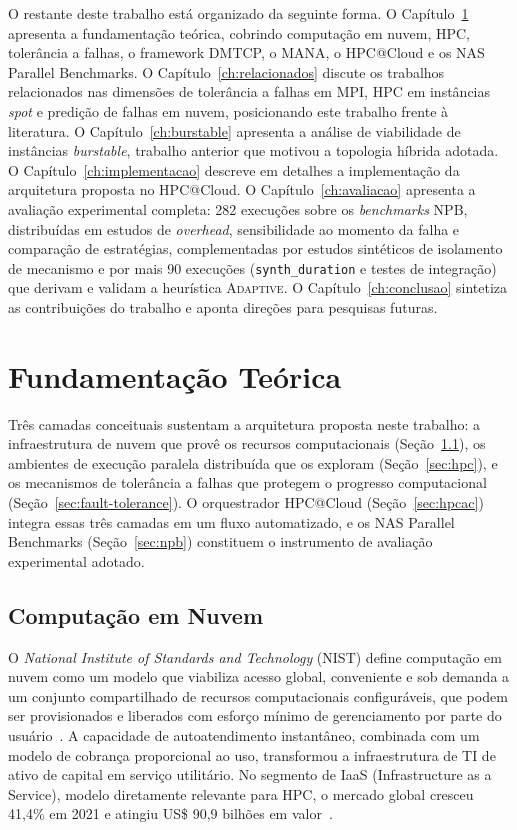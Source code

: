 O restante deste trabalho está organizado da seguinte forma. O
Capítulo~\ref{ch:fundamentacao} apresenta a fundamentação teórica, cobrindo computação
em nuvem, HPC, tolerância a falhas, o framework DMTCP, o MANA, o HPC@Cloud e os NAS
Parallel Benchmarks. O Capítulo~\ref{ch:relacionados} discute os trabalhos relacionados
nas dimensões de tolerância a falhas em MPI, HPC em instâncias \textit{spot} e predição
de falhas em nuvem, posicionando este trabalho frente à literatura. O
Capítulo~\ref{ch:burstable} apresenta a análise de viabilidade de instâncias
\textit{burstable}, trabalho anterior que motivou a topologia híbrida adotada. O
Capítulo~\ref{ch:implementacao} descreve em detalhes a implementação da arquitetura
proposta no HPC@Cloud. O Capítulo~\ref{ch:avaliacao} apresenta a avaliação
experimental completa: 282 execuções sobre os \textit{benchmarks} NPB, distribuídas
em estudos de \textit{overhead}, sensibilidade ao momento da falha e comparação de
estratégias, complementadas por estudos sintéticos de isolamento de mecanismo e por
mais 90 execuções (\texttt{synth\_duration} e testes de integração) que derivam e
validam a heurística \textsc{Adaptive}. O Capítulo~\ref{ch:conclusao} sintetiza as
contribuições do trabalho e aponta direções para pesquisas futuras.


\chapter{Fundamentação Teórica}
\label{ch:fundamentacao}

Três camadas conceituais sustentam a arquitetura proposta neste trabalho: a
infraestrutura de nuvem que provê os recursos computacionais
(Seção~\ref{sec:cloud}), os ambientes de execução paralela distribuída que os
exploram (Seção~\ref{sec:hpc}), e os mecanismos de tolerância a falhas que
protegem o progresso computacional (Seção~\ref{sec:fault-tolerance}). O
orquestrador HPC@Cloud (Seção~\ref{sec:hpcac}) integra essas três camadas em um
fluxo automatizado, e os NAS Parallel Benchmarks (Seção~\ref{sec:npb}) constituem
o instrumento de avaliação experimental adotado.

\section{Computação em Nuvem}
\label{sec:cloud}

O \textit{National Institute of Standards and Technology} (NIST) define computação
em nuvem como um modelo que viabiliza acesso global, conveniente e sob demanda a um
conjunto compartilhado de recursos computacionais configuráveis, que podem ser
provisionados e liberados com esforço mínimo de gerenciamento por parte do
usuário~\cite{mell2011nist}. A capacidade de autoatendimento instantâneo, combinada
com um modelo de cobrança proporcional ao uso, transformou a infraestrutura de TI de
ativo de capital em serviço utilitário. No segmento de IaaS (Infrastructure as a
Service), modelo diretamente relevante para HPC, o mercado global cresceu 41,4\% em
2021 e atingiu US\$ 90,9 bilhões em valor~\cite{gartner2022iaas}.

